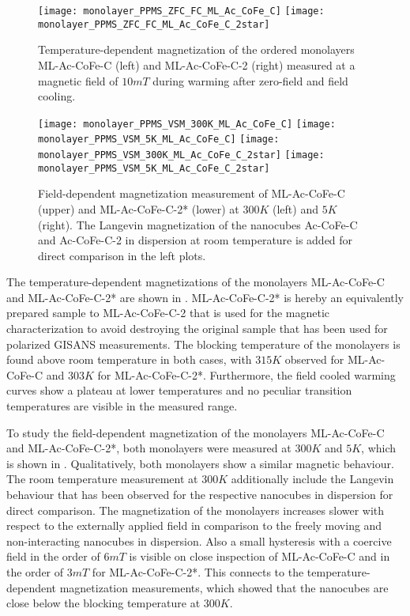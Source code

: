 \documentclass[\main/dresen_thesis.tex]{subfiles}
\begin{document}
  \label{sec:monolayers:magneticStructure:vsm}
  \begin{figure}[tb]
    \centering
    \texttt{[image: monolayer\_PPMS\_ZFC\_FC\_ML\_Ac\_CoFe\_C]}
    \texttt{[image: monolayer\_PPMS\_ZFC\_FC\_ML\_Ac\_CoFe\_C\_2star]}
    \caption{\label{fig:monolayer:magneticStructure:ppmsZFCFC}Temperature-dependent magnetization of the ordered monolayers ML-Ac-CoFe-C (left) and ML-Ac-CoFe-C-2 (right) measured at a magnetic field of $10 \unit{mT}$ during warming after zero-field and field cooling.}
  \end{figure}

  \begin{figure}[!htbp]
    \centering
    \texttt{[image: monolayer\_PPMS\_VSM\_300K\_ML\_Ac\_CoFe\_C]}
    \texttt{[image: monolayer\_PPMS\_VSM\_5K\_ML\_Ac\_CoFe\_C]}
    \texttt{[image: monolayer\_PPMS\_VSM\_300K\_ML\_Ac\_CoFe\_C\_2star]}
    \texttt{[image: monolayer\_PPMS\_VSM\_5K\_ML\_Ac\_CoFe\_C\_2star]}
    \caption{\label{fig:monolayer:magneticStructure:MLAcCoFeC12}Field-dependent magnetization measurement of ML-Ac-CoFe-C (upper) and ML-Ac-CoFe-C-2* (lower) at $300 \unit{K}$ (left) and $5 \unit{K}$ (right). The Langevin magnetization of the nanocubes Ac-CoFe-C and Ac-CoFe-C-2 in dispersion at room temperature is added for direct comparison in the left plots.}
  \end{figure}

  The temperature-dependent magnetizations of the monolayers ML-Ac-CoFe-C and ML-Ac-CoFe-C-2* are shown in .
  ML-Ac-CoFe-C-2* is hereby an equivalently prepared sample to ML-Ac-CoFe-C-2 that is used for the magnetic characterization to avoid destroying the original sample that has been used for polarized GISANS measurements.
  The blocking temperature of the monolayers is found above room temperature in both cases, with $315 \unit{K}$ observed for ML-Ac-CoFe-C and $303 \unit{K}$ for ML-Ac-CoFe-C-2*.
  Furthermore, the field cooled warming curves show a plateau at lower temperatures and no peculiar transition temperatures are visible in the measured range.

  To study the field-dependent magnetization of the monolayers ML-Ac-CoFe-C and ML-Ac-CoFe-C-2*, both monolayers were measured at $300 \unit{K}$ and $5 \unit{K}$, which is shown in . Qualitatively, both monolayers show a similar magnetic behaviour.
  The room temperature measurement at $300 \unit{K}$ additionally include the Langevin behaviour that has been observed for the respective nanocubes in dispersion for direct comparison.
  The magnetization of the monolayers increases slower with respect to the externally applied field in comparison to the freely moving and non-interacting nanocubes in dispersion.
  Also a small hysteresis with a coercive field in the order of $6 \unit{mT}$ is visible on close inspection of ML-Ac-CoFe-C and in the order of $3 \unit{mT}$ for ML-Ac-CoFe-C-2*.
  This connects to the temperature-dependent magnetization measurements, which showed that the nanocubes are close below the blocking temperature at $300 \unit{K}$.
\end{document}
